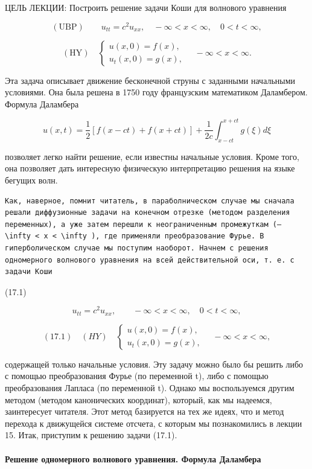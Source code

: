 \documentclass[
  ukrainian,
]{article}
\begin{document}
ЦЕЛЬ ЛЕКЦИИ: Построить решение задачи Коши для волнового уравнения

\[
(\text{UBP}) \qquad u_{tt} = c^2 u_{xx}, \quad -\infty < x < \infty, \quad 0 < t < \infty,
\]

\[
(\text{HY}) \quad \begin{cases} u(x, 0) = f(x), \\ u_t(x, 0) = g(x), \end{cases} \quad -\infty < x < \infty.
\]

Эта задача описывает движение бесконечной струны с заданными начальными
условиями. Она была решена в 1750 году французским математиком
Даламбером. Формула Даламбера

\[
u(x, t) = \frac{1}{2} [f(x - ct) + f(x + ct)] + \frac{1}{2c} \int_{x-ct}^{x+ct} g(\xi) d\xi
\]

позволяет легко найти решение, если известны начальные условия. Кроме
того, она позволяет дать интересную физическую интерпретацию решения на
языке бегущих волн.

\begin{verbatim}
Как, наверное, помнит читатель, в параболническом случае мы сначала решали диффузионные задачи на конечном отрезке (методом разделения переменных), а уже затем перешли к неограниченным промежуткам (—  \infty < x < \infty ), где применяли преобразование Фурье. В гиперболическом случае мы поступим наоборот. Начнем с решения одномерного волнового уравнения на всей действительной оси, т. е. с задачи Коши
\end{verbatim}

(17.1)

\[
u_{tt} = c^{2}u_{xx}, \qquad -\infty < x < \infty, \quad 0 < t < \infty,
\]

\[
(17.1) \quad (HY) \quad \begin{cases} u(x, 0) = f(x), \\ u_{t}(x, 0) = g(x), \end{cases} \quad -\infty < x < \infty,
\]

содержащей только начальные условия. Эту задачу можно было бы решить
либо с помощью преобразования Фурье (по переменной t), либо с помощью
преобразования Лапласа (по переменной t). Однако мы воспользуемся другим
методом (методом канонических координат), который, как мы надеемся,
заинтересует читателя. Этот метод базируется на тех же идеях, что и
метод перехода к движущейся системе отсчета, с которым мы познакомились
в лекции 15. Итак, приступим к решению задачи (17.1).

\paragraph{Решение одномерного волнового уравнения. Формула
Даламбера}\label{ux440ux435ux448ux435ux43dux438ux435-ux43eux434ux43dux43eux43cux435ux440ux43dux43eux433ux43e-ux432ux43eux43bux43dux43eux432ux43eux433ux43e-ux443ux440ux430ux432ux43dux435ux43dux438ux44f.-ux444ux43eux440ux43cux443ux43bux430-ux434ux430ux43bux430ux43cux431ux435ux440ux430}
\end{document}
